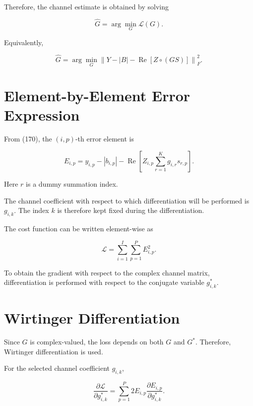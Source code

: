 \documentclass[12pt,a4paper]{article}
\begin{document}
Therefore, the channel estimate is obtained by solving

\begin{equation}
\boxed{
\widehat{G}
=
\arg\min_G
\mathcal{L}(G)
}.
\tag{176}
\end{equation}

Equivalently,

\begin{equation}
\boxed{
\widehat{G}
=
\arg\min_G
\left\|
Y-|B|
-
\operatorname{Re}
[Z\circ(GS)]
\right\|_F^2
}.
\tag{177}
\end{equation}

\section{Element-by-Element Error Expression}

From (170), the $(i,p)$-th error element is

\begin{equation}
E_{i,p}
=
y_{i,p}
-
|b_{i,p}|
-
\operatorname{Re}
\left[
Z_{i,p}
\sum_{r=1}^{K}
g_{i,r}s_{r,p}
\right].
\tag{178}
\end{equation}

Here $r$ is a dummy summation index.

The channel coefficient with respect to which differentiation will be performed is $g_{i,k}$. The index $k$ is therefore kept fixed during the differentiation.

The cost function can be written element-wise as

\begin{equation}
\boxed{
\mathcal{L}
=
\sum_{i=1}^{I}
\sum_{p=1}^{P}
E_{i,p}^2
}.
\tag{179}
\end{equation}

To obtain the gradient with respect to the complex channel matrix, differentiation is performed with respect to the conjugate variable $g_{i,k}^{*}$.

\section{Wirtinger Differentiation}

Since $G$ is complex-valued, the loss depends on both $G$ and $G^*$. Therefore, Wirtinger differentiation is used.

For the selected channel coefficient $g_{i,k}$,

\begin{equation}
\frac{\partial\mathcal{L}}
{\partial g_{i,k}^{*}}
=
\sum_{p=1}^{P}
2E_{i,p}
\frac{\partial E_{i,p}}
{\partial g_{i,k}^{*}}.
\tag{180}
\end{equation}
\end{document}
